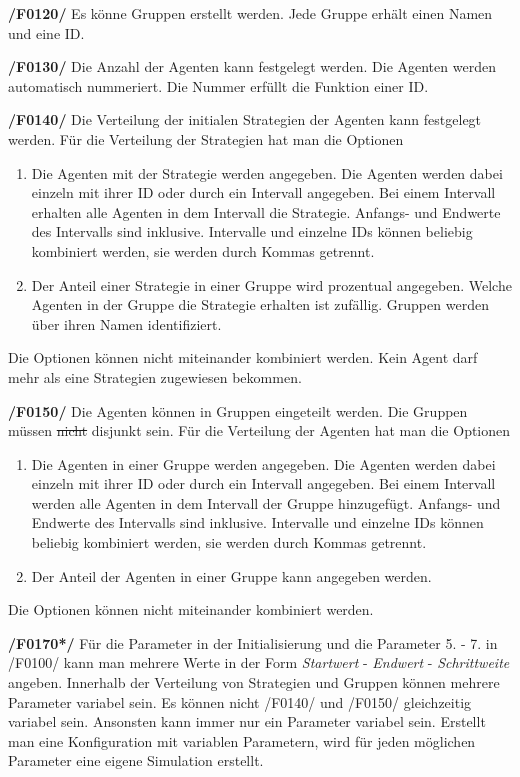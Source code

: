 \textbf{/F0120/}
Es könne Gruppen erstellt werden. Jede Gruppe erhält einen Namen und eine ID. 

\textbf{/F0130/} 
Die Anzahl der Agenten kann festgelegt werden. Die Agenten werden automatisch nummeriert. Die Nummer erfüllt die Funktion einer ID.

\textbf{/F0140/} 
Die Verteilung der initialen Strategien der Agenten kann festgelegt werden. Für die Verteilung der Strategien hat man die Optionen
\begin{enumerate}
\item Die Agenten mit der Strategie werden angegeben. Die Agenten werden dabei einzeln mit ihrer ID oder durch ein Intervall angegeben. Bei einem Intervall erhalten alle Agenten in dem Intervall die Strategie. Anfangs- und Endwerte des Intervalls sind inklusive. Intervalle und einzelne IDs können beliebig kombiniert werden, sie werden durch Kommas getrennt.
\item Der Anteil einer Strategie in einer Gruppe wird prozentual angegeben. Welche Agenten in der Gruppe die Strategie erhalten ist zufällig. Gruppen werden über ihren Namen identifiziert. 
\end{enumerate}
Die Optionen können nicht miteinander kombiniert werden. Kein Agent darf mehr als eine Strategien zugewiesen bekommen.

\textbf{/F0150/} 
Die Agenten können in Gruppen eingeteilt werden. Die Gruppen müssen \st{nicht} disjunkt sein. Für die Verteilung der Agenten hat man die Optionen
\begin{enumerate}
\item Die Agenten in einer Gruppe werden angegeben. Die Agenten werden dabei einzeln mit ihrer ID oder durch ein Intervall angegeben. Bei einem Intervall werden alle Agenten in dem Intervall der Gruppe hinzugefügt. Anfangs- und Endwerte des Intervalls sind inklusive. Intervalle und einzelne IDs können beliebig kombiniert werden, sie werden durch Kommas getrennt.
\item Der Anteil der Agenten in einer Gruppe kann angegeben werden. 
\end{enumerate}
Die Optionen können nicht miteinander kombiniert werden.

\textbf{/F0170*/}
Für die Parameter in der Initialisierung und die Parameter 5. - 7. in /F0100/ kann man mehrere Werte in der Form \emph{Startwert} - \emph{Endwert} - \emph{Schrittweite} angeben. Innerhalb der Verteilung von Strategien und Gruppen können mehrere Parameter variabel sein. Es können nicht /F0140/ und /F0150/ gleichzeitig variabel sein. Ansonsten kann immer nur ein Parameter variabel sein. Erstellt man eine Konfiguration mit variablen Parametern, wird für jeden möglichen Parameter eine eigene Simulation erstellt.

